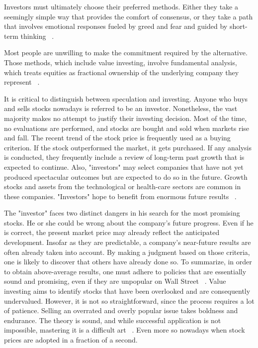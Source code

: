 \documentclass{imc-inf}
\begin{document}
Investors must ultimately choose their preferred methods. Either they take a seemingly simple way that provides the comfort of consensus, or they take a path that involves emotional responses fueled by greed and fear and guided by short-term thinking ~\cite{margin_of_safety}.

Most people are unwilling to make the commitment required by the alternative. Those methods, which include value investing, involve fundamental analysis, which treats equities as fractional ownership of the underlying company they represent ~\cite{margin_of_safety}.

It is critical to distinguish between speculation and investing. Anyone who buys and sells stocks nowadays is referred to be an investor. Nonetheless, the vast majority makes no attempt to justify their investing decision. Most of the time, no evaluations are performed, and stocks are bought and sold when markets rise and fall. The recent trend of the stock price is frequently used as a buying criterion. If the stock outperformed the market, it gets purchased. If any analysis is conducted, they frequently include a review of long-term past growth that is expected to continue. Also, "investors" may select companies that have not yet produced spectacular outcomes but are expected to do so in the future. Growth stocks and assets from the technological or health-care sectors are common in these companies. "Investors" hope to benefit from enormous future results ~\cite{the_intelligent_investor}. 

The "investor" faces two distinct dangers in his search for the most promising stocks. He or she could be wrong about the company's future progress. Even if he is correct, the present market price may already reflect the anticipated development. Insofar as they are predictable, a company's near-future results are often already taken into account. By making a judgment based on those criteria, one is likely to discover that others have already done so. To summarize, in order to obtain above-average results, one must adhere to policies that are essentially sound and promising, even if they are unpopular on Wall Street ~\cite{the_intelligent_investor}.
Value investing aims to identify stocks that have been overlooked and are consequently undervalued. However, it is not so straightforward, since the process requires a lot of patience. Selling an overrated and overly popular issue takes boldness and endurance. The theory is sound, and while successful application is not impossible, mastering it is a difficult art ~\cite{the_intelligent_investor}. Even more so nowadays when stock prices are adopted in a fraction of a second.
\end{document}

